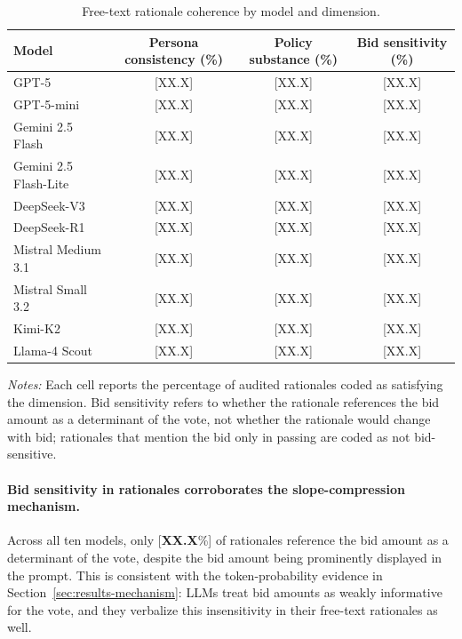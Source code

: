 \documentclass[12pt]{article}
\begin{document}
\begin{table}[h]
    \centering
    \caption{Free-text rationale coherence by model and dimension.}
    \label{tab:rationale}
    \begin{threeparttable}
    \begin{tabular}{lccc}
        \toprule
        Model & Persona consistency (\%) & Policy substance (\%) & Bid sensitivity (\%) \\
        \midrule
        GPT-5                 & [XX.X] & [XX.X] & [XX.X] \\
        GPT-5-mini            & [XX.X] & [XX.X] & [XX.X] \\
        Gemini 2.5 Flash      & [XX.X] & [XX.X] & [XX.X] \\
        Gemini 2.5 Flash-Lite & [XX.X] & [XX.X] & [XX.X] \\
        DeepSeek-V3           & [XX.X] & [XX.X] & [XX.X] \\
        DeepSeek-R1           & [XX.X] & [XX.X] & [XX.X] \\
        Mistral Medium 3.1    & [XX.X] & [XX.X] & [XX.X] \\
        Mistral Small 3.2     & [XX.X] & [XX.X] & [XX.X] \\
        Kimi-K2               & [XX.X] & [XX.X] & [XX.X] \\
        Llama-4 Scout         & [XX.X] & [XX.X] & [XX.X] \\
        \bottomrule
    \end{tabular}
    \begin{tablenotes}\footnotesize
        \item \textit{Notes:} Each cell reports the percentage of audited rationales coded as satisfying the dimension. Bid sensitivity refers to whether the rationale references the bid amount as a determinant of the vote, not whether the rationale would change with bid; rationales that mention the bid only in passing are coded as not bid-sensitive.
    \end{tablenotes}
    \end{threeparttable}
\end{table}

\paragraph{Bid sensitivity in rationales corroborates the slope-compression mechanism.} Across all ten models, only [\textbf{XX.X}\%] of rationales reference the bid amount as a determinant of the vote, despite the bid amount being prominently displayed in the prompt. This is consistent with the token-probability evidence in Section~\ref{sec:results-mechanism}: LLMs treat bid amounts as weakly informative for the vote, and they verbalize this insensitivity in their free-text rationales as well.
\end{document}
